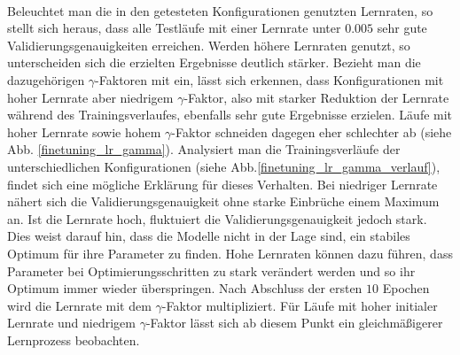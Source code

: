 \\
Beleuchtet man die in den getesteten Konfigurationen genutzten Lernraten, so stellt sich heraus, dass alle Testläufe mit einer Lernrate unter $0.005$ sehr gute Validierungsgenauigkeiten erreichen. Werden höhere Lernraten genutzt, so unterscheiden sich die erzielten Ergebnisse deutlich stärker. Bezieht man die dazugehörigen $\gamma$-Faktoren mit ein, lässt sich erkennen, dass Konfigurationen mit hoher Lernrate aber niedrigem $\gamma$-Faktor, also mit starker Reduktion der Lernrate während des Trainingsverlaufes, ebenfalls sehr gute Ergebnisse erzielen. Läufe mit hoher Lernrate sowie hohem $\gamma$-Faktor schneiden dagegen eher schlechter ab (siehe Abb. \ref{finetuning_lr_gamma}). Analysiert man die Trainingsverläufe der unterschiedlichen Konfigurationen (siehe Abb.\ref{finetuning_lr_gamma_verlauf}), findet sich eine mögliche Erklärung für dieses Verhalten. Bei niedriger Lernrate nähert sich die Validierungsgenauigkeit ohne starke Einbrüche einem Maximum an. Ist die Lernrate hoch, fluktuiert die Validierungsgenauigkeit jedoch stark. Dies weist darauf hin, dass die Modelle nicht in der Lage sind, ein stabiles Optimum für ihre Parameter zu finden. Hohe Lernraten können dazu führen, dass Parameter bei Optimierungsschritten zu stark verändert werden und so ihr Optimum immer wieder überspringen. Nach Abschluss der ersten $10$ Epochen wird die Lernrate mit dem $\gamma$-Faktor multipliziert. Für Läufe mit hoher initialer Lernrate und niedrigem $\gamma$-Faktor lässt sich ab diesem Punkt ein gleichmäßigerer Lernprozess beobachten. 
